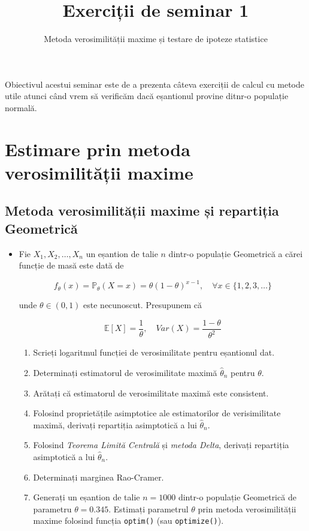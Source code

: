 \documentclass[]{article}
\title{Exerciții de seminar 1}
\subtitle{Metoda verosimilității maxime și testare de ipoteze statistice}
\author{}
\date{}
\providecommand{\tightlist}{%
  \setlength{\itemsep}{0pt}\setlength{\parskip}{0pt}}
\newenvironment{frshaded*}{%
  \def\FrameCommand{\fboxrule=\FrameRule\fboxsep=\FrameSep \fcolorbox{framecolor}{shadecolor1}}%
  \MakeFramed {\advance\hsize-\width \FrameRestore}}%
{\endMakeFramed}
\newenvironment{rmdblock}[1]
  {\begin{frshaded*}
  \begin{itemize}
  \renewcommand{\labelitemi}{
    \raisebox{-.7\height}[0pt][0pt]{
      {\setkeys{Gin}{width=2em,keepaspectratio}\texttt{[image: images/icons/\#1]}}
    }
  }
  \item
  }
  {
  \end{itemize}
  \end{frshaded*}
  }
\newenvironment{rmdexercise}
  {\begin{rmdblock}{exercise}}
  {\end{rmdblock}}
\begin{document}
\maketitle

\thispagestyle{fancy}

Obiectivul acestui seminar este de a prezenta câteva exerciții de calcul
cu metode utile atunci când vrem să verificăm dacă eșantionul provine
ditnr-o populație normală.

\section{Estimare prin metoda verosimilității
maxime}\label{estimare-prin-metoda-verosimilitatii-maxime}

\subsection{Metoda verosimilității maxime și repartiția
Geometrică}\label{metoda-verosimilitatii-maxime-si-repartitia-geometrica}

\begin{rmdexercise}
Fie \(X_1,X_2,\ldots,X_n\) un eșantion de talie \(n\) dintr-o populație
Geometrică a cărei funcție de masă este dată de

\[
  f_{\theta}(x) = \mathbb{P}_{\theta}(X = x) = \theta (1-\theta)^{x-1}, \quad \forall x\in\{1,2,3,\ldots\}  
\]

unde \(\theta\in(0,1)\) este necunoscut. Presupunem că

\[
  \mathbb{E}[X] = \frac{1}{\theta}, \quad Var(X) = \frac{1-\theta}{\theta^2}
\]

\begin{enumerate}
\def\labelenumi{\alph{enumi})}
\tightlist
\item
  Scrieți logaritmul funcției de verosimilitate pentru eșantionul dat.
\item
  Determinați estimatorul de verosimilitate maximă \(\hat{\theta}_n\)
  pentru \(\theta\).
\item
  Arătați că estimatorul de verosimilitate maximă este consistent.
\item
  Folosind proprietățile asimptotice ale estimatorilor de verisimilitate
  maximă, derivați repartiția asimptotică a lui \(\hat{\theta}_n\).
\item
  Folosind \emph{Teorema Limită Centrală} și \emph{metoda Delta},
  derivați repartiția asimptotică a lui \(\hat{\theta}_n\).
\item
  Determinați marginea Rao-Cramer.
\item
  Generați un eșantion de talie \(n=1000\) dintr-o populație Geometrică
  de parametru \(\theta = 0.345\). Estimați parametrul \(\theta\) prin
  metoda verosimilității maxime folosind funcția \texttt{optim()} (sau
  \texttt{optimize()}).
\end{enumerate}
\end{rmdexercise}
\end{document}
